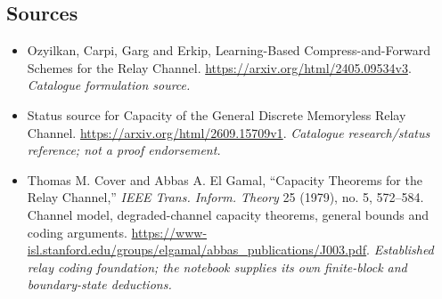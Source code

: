 \documentclass[11pt,a4paper]{article}
\numberwithin{equation}{section}
\begin{document}
\subsection{Sources}
\begin{itemize}\raggedright
\item[\textnormal{[S1]}]\hypertarget{source:statement:1}{} Ozyilkan, Carpi, Garg and Erkip, Learning-Based Compress-and-Forward Schemes for the Relay Channel.
\url{https://arxiv.org/html/2405.09534v3}.
{\small\textit{Catalogue formulation source.}}
\item[\textnormal{[S2]}]\hypertarget{source:statement:2}{} Status source for Capacity of the General Discrete Memoryless Relay Channel.
\url{https://arxiv.org/html/2609.15709v1}.
{\small\textit{Catalogue research/status reference; not a proof endorsement.}}
\item[\textnormal{[E1]}]\hypertarget{extra:statement:1}{} Thomas M. Cover and Abbas A. El Gamal, ``Capacity Theorems for the Relay Channel,'' \emph{IEEE Trans. Inform. Theory} 25 (1979), no. 5, 572--584. Channel model, degraded-channel capacity theorems, general bounds and coding arguments.
\url{https://www-isl.stanford.edu/groups/elgamal/abbas_publications/J003.pdf}.
{\small\textit{Established relay coding foundation; the notebook supplies its own finite-block and boundary-state deductions.}}
\end{itemize}
\end{document}
